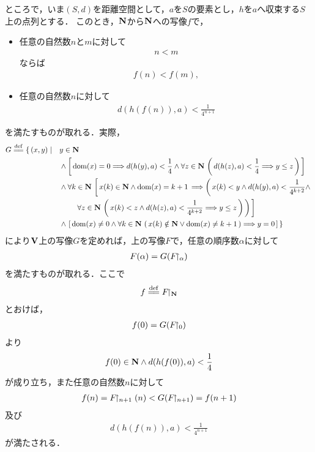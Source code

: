 	ところで，いま$(S,d)$を距離空間として，$a$を$S$の要素とし，$h$を$a$へ収束する$S$上の点列とする．
	このとき，$\mathbf{N}$から$\mathbf{N}$への写像$f$で，
	\begin{itemize}
		\item 任意の自然数$n$と$m$に対して
			\begin{align}
				n < m
			\end{align}
			ならば
			\begin{align}
				f(n) < f(m),
			\end{align}
			
		\item 任意の自然数$n$に対して
			\begin{align}
				d(h(f(n)),a) < \frac{1}{4^{n+1}}
			\end{align}
	\end{itemize}
	を満たすものが取れる．実際，
	\begin{align}
		G \defeq \{\, (x,y) \mid \quad &y \in \Natural \\
		&\wedge \left[\, \dom{x} = 0 \Longrightarrow d(h(y),a) < \frac{1}{4} \wedge \forall z \in \Natural\, \left(\, d(h(z),a) < \frac{1}{4}
		\Longrightarrow y \leq z\, \right)\, \right] \\
		&\wedge \forall k \in \Natural\, \left[\, x(k) \in \Natural \wedge \dom{x} = k+1\, \Longrightarrow 
		\left(\, x(k) < y \wedge d(h(y),a) < \frac{1}{4^{k+2}} \wedge \right. \right. \\
		&\left.\left. \quad\quad \forall z \in \Natural\, 
		\left(\, x(k) < z \wedge d(h(z),a) < \frac{1}{4^{k+2}} \Longrightarrow y \leq z\, \right)\, \right)\, \right] \\
		&\wedge \left. \left[\, \dom{x} \neq 0 \wedge \forall k \in \Natural\, \left(\, x(k) \notin \Natural \vee \dom{x} \neq k+1\, \right)
		\Longrightarrow y = 0\, \right]\, \right\}
	\end{align}
	により$\mathbf{V}$上の写像$G$を定めれば，上の写像$F$で，任意の順序数$\alpha$に対して
	\begin{align}
		F(\alpha) = G(F\hspace{-0.41em}\upharpoonright_{\alpha})
	\end{align}
	を満たすものが取れる．ここで
	\begin{align}
		f \defeq \rest{F}{\Natural}
	\end{align}
	とおけば，
	\begin{align}
		f(0) = G(F\hspace{-0.41em}\upharpoonright_{0})
	\end{align}
	より
	\begin{align}
		f(0) \in \mathbf{N} \wedge d(h(f(0)),a) < \frac{1}{4}
	\end{align}
	が成り立ち，また任意の自然数$n$に対して
	\begin{align}
		f(n) = F\hspace{-0.41em}\upharpoonright_{n+1}(n) < G(F\hspace{-0.41em}\upharpoonright_{n+1}) = f(n+1)
	\end{align}
	及び
	\begin{align}
		d(h(f(n)),a) < \frac{1}{4^{n+1}}
	\end{align}
	が満たされる．
	
